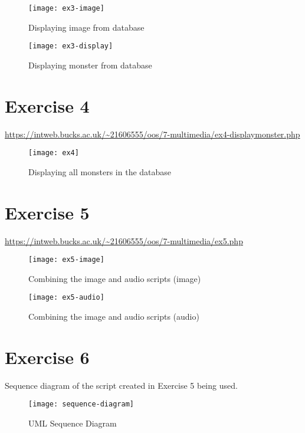 \captionsetup{type=figure}


\clearpage
\captionsetup{type=figure}


\captionsetup{type=figure}


\begin{figure}[H]
  \caption{Displaying image from database}
  \centering
  \texttt{[image: ex3-image]}
\end{figure}

\begin{figure}[H]
  \caption{Displaying monster from database}
  \centering
  \texttt{[image: ex3-display]}
\end{figure}

\clearpage
\section{Exercise 4}

\url{https://intweb.bucks.ac.uk/~21606555/oos/7-multimedia/ex4-displaymonster.php}

\captionsetup{type=figure}


\begin{figure}[H]
  \caption{Displaying all monsters in the database}
  \centering
  \texttt{[image: ex4]}
\end{figure}

\clearpage
\section{Exercise 5}

\url{https://intweb.bucks.ac.uk/~21606555/oos/7-multimedia/ex5.php}

\captionsetup{type=figure}


\begin{figure}[H]
  \caption{Combining the image and audio scripts (image)}
  \centering
  \texttt{[image: ex5-image]}
\end{figure}

\begin{figure}[H]
  \caption{Combining the image and audio scripts (audio)}
  \centering
  \texttt{[image: ex5-audio]}
\end{figure}

\clearpage
\section{Exercise 6}

Sequence diagram of the script created in Exercise 5 being used.

\begin{figure}[H]
  \caption{UML Sequence Diagram}
  \centering
  \texttt{[image: sequence-diagram]}
\end{figure}
